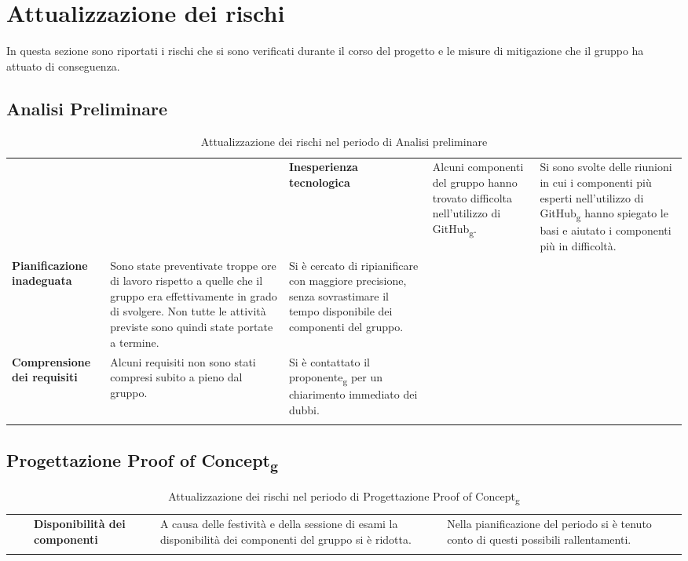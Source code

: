 \section{Attualizzazione dei rischi}
In questa sezione sono riportati i rischi che si sono verificati durante il corso del progetto e 
le misure di mitigazione che il gruppo ha attuato di conseguenza.
\subsection{Analisi Preliminare}
\begin{longtable}{ 
	>{\centering}M{0.20\textwidth} 
	>{\raggedright}M{0.30\textwidth}
	>{\raggedright}M{0.40\textwidth}
	}
	\rowcolorhead
	\centering 
	 &	
	 &
	\endfirsthead	
	\endhead
	
	\textbf{Inesperienza tecnologica} & 
    Alcuni componenti del gruppo hanno trovato difficolta nell'utilizzo di GitHub\textsubscript{g}. & 
    Si sono svolte delle riunioni in cui i componenti più esperti nell'utilizzo di GitHub\textsubscript{g} 
    hanno spiegato le basi e aiutato i componenti più in difficoltà.  \tabularnewline
    \textbf{Pianificazione inadeguata} & Sono state preventivate troppe ore di 
    lavoro rispetto a quelle che il gruppo era effettivamente in grado di svolgere. Non tutte le 
    attività previste sono quindi state portate a termine.  & 
    Si è cercato di ripianificare con maggiore precisione, senza sovrastimare il tempo disponibile dei 
    componenti del gruppo. \tabularnewline
    \textbf{Comprensione dei requisiti} & Alcuni requisiti non sono stati compresi subito a pieno dal gruppo.  & 
    Si è contattato il proponente\textsubscript{g} per un chiarimento immediato dei dubbi. \tabularnewline
	\captionline \caption{Attualizzazione dei rischi nel periodo di Analisi preliminare}
\end{longtable}

\subsection{Progettazione Proof of Concept\textsubscript{g}}
\begin{longtable}{ 
	>{\centering}M{0.20\textwidth} 
	>{\raggedright}M{0.30\textwidth}
	>{\raggedright}M{0.40\textwidth}
	}
	\rowcolorhead
	\centering 
	 &	
	 &
	\endfirsthead	
	\endhead
	
	\textbf{Disponibilità dei componenti} & 
    A causa delle festività e della sessione di esami la disponibilità dei componenti del gruppo 
    si è ridotta. & 
    Nella pianificazione del periodo si è tenuto conto di questi possibili rallentamenti.  \tabularnewline
	\captionline \caption{Attualizzazione dei rischi nel periodo di Progettazione Proof of Concept\textsubscript{g}}
\end{longtable}

